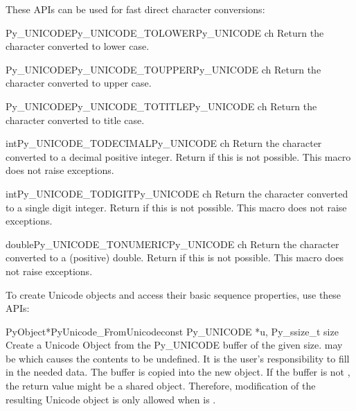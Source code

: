 These APIs can be used for fast direct character conversions:

\begin{cfuncdesc}{Py_UNICODE}{Py_UNICODE_TOLOWER}{Py_UNICODE ch}
  Return the character  converted to lower case.
\end{cfuncdesc}

\begin{cfuncdesc}{Py_UNICODE}{Py_UNICODE_TOUPPER}{Py_UNICODE ch}
  Return the character  converted to upper case.
\end{cfuncdesc}

\begin{cfuncdesc}{Py_UNICODE}{Py_UNICODE_TOTITLE}{Py_UNICODE ch}
  Return the character  converted to title case.
\end{cfuncdesc}

\begin{cfuncdesc}{int}{Py_UNICODE_TODECIMAL}{Py_UNICODE ch}
  Return the character  converted to a decimal positive
  integer.  Return  if this is not possible.  This macro
  does not raise exceptions.
\end{cfuncdesc}

\begin{cfuncdesc}{int}{Py_UNICODE_TODIGIT}{Py_UNICODE ch}
  Return the character  converted to a single digit integer.
  Return  if this is not possible.  This macro does not raise
  exceptions.
\end{cfuncdesc}

\begin{cfuncdesc}{double}{Py_UNICODE_TONUMERIC}{Py_UNICODE ch}
  Return the character  converted to a (positive) double.
  Return  if this is not possible.  This macro does not raise
  exceptions.
\end{cfuncdesc}


To create Unicode objects and access their basic sequence properties,
use these APIs:

\begin{cfuncdesc}{PyObject*}{PyUnicode_FromUnicode}{const Py_UNICODE *u,
                                                    Py_ssize_t size}
  Create a Unicode Object from the Py_UNICODE buffer  of the
  given size.  may be \NULL{} which causes the contents to be
  undefined. It is the user's responsibility to fill in the needed
  data.  The buffer is copied into the new object. If the buffer is
  not \NULL{}, the return value might be a shared object. Therefore,
  modification of the resulting Unicode object is only allowed when
   is \NULL{}.
\end{cfuncdesc}

